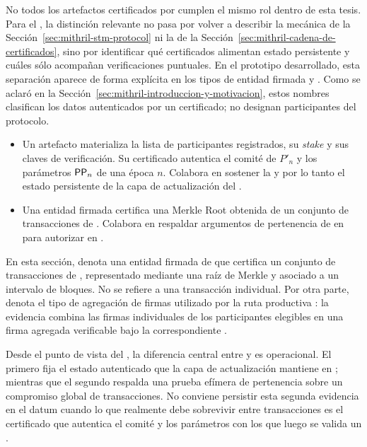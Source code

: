 
No todos los artefactos certificados por \Mithril cumplen el mismo rol dentro de esta tesis. Para el \zkBridge, la distinción relevante no pasa por volver a describir la mecánica \STM de la Sección~\ref{sec:mithril-stm-protocol} ni la \CertificateChain de la Sección~\ref{sec:mithril-cadena-de-certificados}, sino por identificar qué certificados alimentan estado persistente y cuáles sólo acompañan verificaciones puntuales. En el prototipo desarrollado, esta separación aparece de forma explícita en los tipos de entidad firmada \MithrilStakeDistribution y \CardanoTransactions. Como se aclaró en la Sección~\ref{sec:mithril-introduccion-y-motivacion}, estos nombres clasifican los datos autenticados por un certificado; no designan participantes del protocolo.

\begin{itemize}[noitemsep]
	\item Un artefacto \MithrilStakeDistribution materializa la lista de participantes registrados, su \textit{stake} y sus claves de verificación. Su certificado autentica el comité de \Mithril $P'_n$ y los parámetros $\mathsf{PP}_n$ de una época $n$. Colabora en sostener la \CertificateChain y por lo tanto el estado persistente de la capa de actualización del \zkBridge.
	\item Una entidad firmada \CardanoTransactions certifica una Merkle Root obtenida de un conjunto de transacciones de \Cardano. Colabora en respaldar argumentos de pertenencia de \LockTx en \ChainA para autorizar \MintTx en \ChainB.
\end{itemize}

En esta sección, \CardanoTransactions denota una entidad firmada de \Mithril que certifica un conjunto de transacciones de \Cardano, representado mediante una raíz de Merkle y asociado a un intervalo de bloques. No se refiere a una transacción individual. Por otra parte, \Concatenation denota el tipo de agregación de firmas utilizado por la ruta productiva \Pythagoras: la evidencia combina las firmas individuales \BLS de los participantes elegibles en una firma agregada verificable bajo la \AVK correspondiente \cite{MithrilDocsTransactions,MithrilSTMRepo}.

Desde el punto de vista del \zkBridge, la diferencia central entre \MithrilStakeDistribution y \CardanoTransactions es operacional. El primero fija el estado autenticado que la capa de actualización mantiene en \ChainB; mientras que el segundo respalda una prueba efímera de pertenencia sobre un compromiso global de transacciones. No conviene persistir esta segunda evidencia en el datum cuando lo que realmente debe sobrevivir entre transacciones es el certificado que autentica el comité y los parámetros con los que luego se valida un \TransactionSnapshotCertificate.

